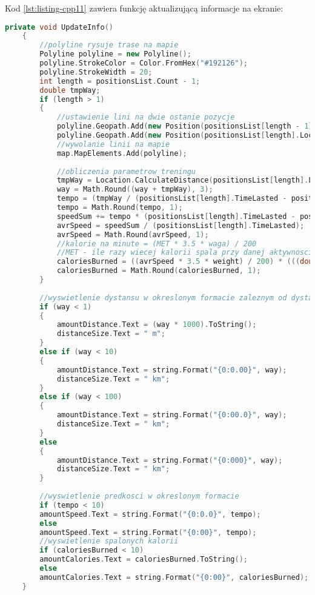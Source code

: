 Kod \ref{lst:listing-cpp11} zawiera funkcję aktualizującą informacje na ekranie:
\begin{lstlisting}[caption=Aktualizowanie informacji na ekranie, label={lst:listing-cpp11}, language=C++]
	 private void UpdateInfo()
	{
		//polyline rysuje trase na mapie
		Polyline polyline = new Polyline();
		polyline.StrokeColor = Color.FromHex("#192126");
		polyline.StrokeWidth = 20;
		int length = positionsList.Count - 1;
		double tmpWay;
		if (length > 1)
		{
			//ustawienie lini na dwie ostanie pozycje
			polyline.Geopath.Add(new Position(positionsList[length - 1].Location.Latitude, positionsList[length - 1].Location.Longitude));
			polyline.Geopath.Add(new Position(positionsList[length].Location.Latitude, positionsList[length].Location.Longitude));
			//wywolanie linii na mapie
			map.MapElements.Add(polyline);
			
			//obliczenia parametrow treningu
			tmpWay = Location.CalculateDistance(positionsList[length].Location, positionsList[length - 1].Location, DistanceUnits.Kilometers);
			way = Math.Round((way + tmpWay), 3);
			tempo = (tmpWay / (positionsList[length].TimeLasted - positionsList[length - 1].TimeLasted)) * 3600;
			tempo = Math.Round(tempo, 1);
			speedSum += tempo * (positionsList[length].TimeLasted - positionsList[length - 1].TimeLasted);
			avrSpeed = speedSum / (positionsList[length].TimeLasted);
			avrSpeed = Math.Round(avrSpeed, 1);
			//kalorie na minute = (MET * 3.5 * waga) / 200
			//MET - ile razy wiecej kalorii spala przy danej aktywnosci w porowaniu do odpoczynku
			caloriesBurned = ((avrSpeed * 3.5 * weight) / 200) * (((double)positionsList[length].TimeLasted) / 60);
			caloriesBurned = Math.Round(caloriesBurned, 1);
		}
		
		//wyswietlenie dystansu w okreslonym formacie zaleznym od dystansu
		if (way < 1)
		{
			amountDistance.Text = (way * 1000).ToString();
			distanceSize.Text = " m";
		}
		else if (way < 10)
		{
			amountDistance.Text = string.Format("{0:0.00}", way);
			distanceSize.Text = " km";
		}
		else if (way < 100)
		{
			amountDistance.Text = string.Format("{0:00.0}", way);
			distanceSize.Text = " km";
		}
		else
		{
			amountDistance.Text = string.Format("{0:000}", way);
			distanceSize.Text = " km";
		}
		
		//wyswietlenie predkosci w okreslonym formacie
		if (tempo < 10)
		amountSpeed.Text = string.Format("{0:0.0}", tempo);
		else
		amountSpeed.Text = string.Format("{0:00}", tempo);
		//wyswietlenie spalonych kalorii
		if (caloriesBurned < 10)
		amountCalories.Text = caloriesBurned.ToString();
		else
		amountCalories.Text = string.Format("{0:00}", caloriesBurned);
	}
\end{lstlisting}

